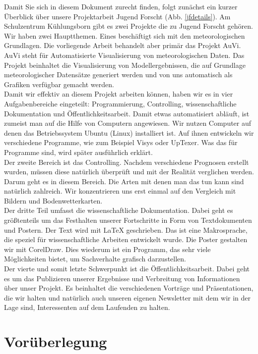 \documentclass[a4paper,oneside,12pt,titlepage]{article}
\begin{document}
Damit Sie sich in diesem Dokument zurecht finden, folgt zunächst ein kurzer Überblick über unsere Projektarbeit Jugend Forscht (Abb. \ref{jfdetails}). Am Schulzentrum Kühlungsborn gibt es zwei Projekte die zu Jugend Forscht gehören. Wir haben zwei Hauptthemen. Eines beschäftigt sich mit den meteorologischen Grundlagen. Die vorliegende Arbeit behandelt aber primär das Projekt AuVi. AuVi steht für Automatisierte Visualisierung von meteorologischen Daten. Das Projekt beinhaltet die Visualisierung von Modellergebnissen, die auf Grundlage meteorologischer Datensätze generiert werden und von uns automatisch als Grafiken verfügbar gemacht werden.\\ Damit wir effektiv an diesem Projekt arbeiten können, haben wir es in vier Aufgabenbereiche eingeteilt: Programmierung, Controlling, wissenschaftliche Dokumentation und Öffentlichkeitsarbeit. Damit etwas automatisiert abläuft, ist zumeist man auf die Hilfe von Computern angewiesen. Wir nutzen Computer auf denen das Betriebssystem Ubuntu (Linux) installiert ist. Auf ihnen entwickeln wir verschiedene Programme, wie zum Beispiel Visys oder UpTexer. Was das für Programme sind, wird später ausführlich erklärt. \\ Der zweite Bereich ist das Controlling. Nachdem verschiedene Prognosen erstellt wurden, müssen diese natürlich überprüft und mit der Realität verglichen werden. Darum geht es in diesem Bereich. Die Arten mit denen man das tun kann sind natürlich zahlreich. Wir konzentrieren uns erst einmal auf den Vergleich mit Bildern und Bodenwetterkarten. \\ Der dritte Teil umfasst die wissenschaftliche Dokumentation. Dabei geht es größtenteils um das Festhalten unserer Fortschritte in Form von Textdokumenten und Postern. Der Text wird mit \LaTeX\mbox{} geschrieben. Das ist eine Makrosprache, die speziel für wissenschaftliche Arbeiten entwickelt wurde. Die Poster gestalten wir mit CorelDraw. Dies wiederum ist ein Programm, das sehr viele Möglichkeiten bietet, um Sachverhalte grafisch darzustellen.\\  
Der vierte und somit letzte Schwerpunkt ist die Öffentlichkeitsarbeit. Dabei geht es um das Publizieren unserer Ergebnisse und Verbreitung von Informationen über unser Projekt. Es beinhaltet die verschiedenen Vorträge und Präsentationen, die wir halten und natürlich auch unseren eigenen Newsletter mit dem wir in der Lage sind, Interessenten auf dem Laufenden zu halten.


\newpage
\section{Vorüberlegung}
\end{document}
